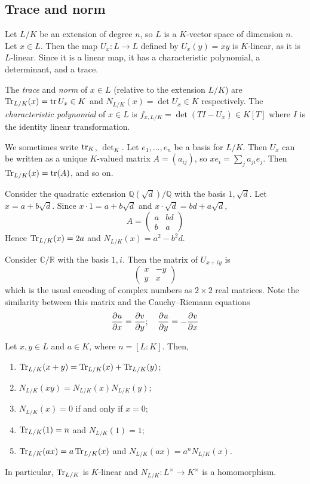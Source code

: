 \subsection{Trace and norm}
Let \( L / K \) be an extension of degree \( n \), so \( L \) is a \( K \)-vector space of dimension \( n \).
Let \( x \in L \).
Then the map \( U_x \colon L \to L \) defined by \( U_x(y) = xy \) is \( K \)-linear, as it is \( L \)-linear.
Since it is a linear map, it has a characteristic polynomial, a determinant, and a trace.
\begin{definition}
	The \emph{trace} and \emph{norm} of \( x \in L \) (relative to the extension \( L / K \)) are \( \Tr_{L/K}(x) = \tr U_x \in K \) and \( N_{L/K}(x) = \det U_x \in K \) respectively.
	The \emph{characteristic polynomial} of \( x \in L \) is \( f_{x,L/K} = \det (TI - U_x) \in K[T] \) where \( I \) is the identity linear transformation.
\end{definition}
We sometimes write \( \tr_K \), \( \det_K \).
Let \( e_1, \dots, e_n \) be a basis for \( L / K \).
Then \( U_x \) can be written as a unique \( K \)-valued matrix \( A = (a_{ij}) \), so \( xe_i = \sum_j a_{ji} e_j \).
Then \( \Tr_{L/K}(x) = \tr(A) \), and so on.
\begin{example}
	Consider the quadratic extension \( \mathbb Q(\sqrt d)/\mathbb Q \) with the basis \( 1, \sqrt d \).
	Let \( x = a + b\sqrt d \).
	Since \( x \cdot 1 = a + b \sqrt d \) and \( x \cdot \sqrt d = bd + a\sqrt d \),
	\[ A = \begin{pmatrix}
		a & bd \\
		b & a
	\end{pmatrix} \]
	Hence \( \Tr_{L/K}(x) = 2a \) and \( N_{L/K}(x) = a^2 - b^2 d \).
\end{example}
\begin{example}
	Consider \( \mathbb C / \mathbb R \) with the basis \( 1, i \).
	Then the matrix of \( U_{x+iy} \) is
	\[ \begin{pmatrix}
		x & -y \\
		y & x
	\end{pmatrix} \]
	which is the usual encoding of complex numbers as \( 2 \times 2 \) real matrices.
	Note the similarity between this matrix and the Cauchy--Riemann equations
	\[ \pdv{u}{x} = \pdv{v}{y};\quad \pdv{u}{y} = -\pdv{v}{x} \]
\end{example}
\begin{lemma}
	Let \( x, y \in L \) and \( a \in K \), where \( n = [L : K] \).
	Then,
	\begin{enumerate}
		\item \( \Tr_{L/K}(x+y) = \Tr_{L/K}(x) + \Tr_{L/K}(y) \);
		\item \( N_{L/K}(xy) = N_{L/K}(x)N_{L/K}(y) \);
		\item \( N_{L/K}(x) = 0 \) if and only if \( x = 0 \);
		\item \( \Tr_{L/K}(1) = n \) and \( N_{L/K}(1) = 1 \);
		\item \( \Tr_{L/K}(ax) = a\Tr_{L/K}(x) \) and \( N_{L/K}(ax) = a^n N_{L/K}(x) \).
	\end{enumerate}
	In particular, \( \Tr_{L/K} \) is \( K \)-linear and \( N_{L/K} \colon L^\times \to K^\times \) is a homomorphism.
\end{lemma}
